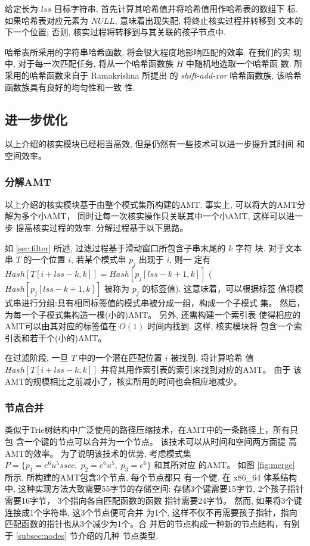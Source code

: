 给定长为 $lss$ 目标字符串, 首先计算其哈希值并将哈希值用作哈希表的数组下
标. 如果哈希表对应元素为 $NULL$, 意味着出现失配, 将终止核实过程并转移到
文本的下一个位置; 否则, 核实过程将转移到与其关联的孩子节点中.

哈希表所采用的字符串哈希函数, 将会很大程度地影响匹配的效率. 在我们的实
现中, 对于每一次匹配任务, 将从一个哈希函数族 $H$ 中随机地选取一个哈希函
数. 所采用的哈希函数来自于 Ramakrishna \cite{Ramakrishna1997} 所提出
的 \emph{shift-add-xor} 哈希函数族, 该哈希函数族具有良好的均匀性和一致
性.

\subsection{进一步优化}
\label{sec:further improments}

以上介绍的核实模块已经相当高效, 但是仍然有一些技术可以进一步提升其时间
和空间效率。

\subsubsection{分解AMT}
\label{sec:divide amt}

以上介绍的核实模块基于由整个模式集所构建的AMT. 事实上, 可以将大的AMT分
解为多个小AMT， 同时让每一次核实操作只关联其中一个小AMT, 这样可以进一步
提高核实过程的效率. 分解过程基于以下思路。

如 \ref{sec:filter} 所述, 过滤过程基于滑动窗口所包含子串末尾的 $k$ 字符
块. 对于文本串 $T$ 的一个位置 $i$, 若某个模式串 $p_j$ 出现于 $i$, 则一
定有 $Hash[T[i+lss-k,k]] = Hash[p_j[lss-k+1,k]]$
($Hash[p_j[lss-k+1,k]]$ 被称为 $p_j$ 的标签值). 这意味着，可以根据标签
值将模式串进行分组:具有相同标签值的模式串被分成一组，构成一个子模式
集。 然后，为每一个子模式集构造一棵(小的)AMT。 另外, 还需构建一个索引表
使得相应的AMT可以由其对应的标签值在 $O(1)$ 时间内找到. 这样, 核实模块将
包含一个索引表和若干个(小的)AMT。

在过滤阶段, 一旦 $T$ 中的一个潜在匹配位置 $i$ 被找到, 将计算哈希
值 $Hash[T[i+lss-k,k]]$ 并将其用作索引表的索引来找到对应的AMT。 由于
该AMT的规模相比之前减小了，核实所用的时间也会相应地减少。

\subsubsection{节点合并}
\label{sec:node merge}

类似于Trie树结构中广泛使用的路径压缩技术，在AMT中的一条路径上，所有只包
含一个键的节点可以合并为一个节点。 该技术可以从时间和空间两方面提
高AMT的效率。 为了说明该技术的优势, 考虑模式集
$P=\{p_1=e^6u^5sscc,\; p_2=e^6u^5,\; p_3=e^6\}$ 和其所对应
的AMT。 如图 \ref{fig:merge} 所示, 所构建的AMT包含3个节点, 每个节点都只
有一个键. 在 x86\_64 体系结构中, 这种实现方法大致需要55字节的存储空间:
存储3个键需要15字节, 2个孩子指针需要16字节， 3个指向各自匹配函数的函数
指针需要24字节。 然而, 如果将3个键连接成1个字符串, 这3个节点便可合并
为1个, 这样不仅不再需要孩子指针，指向匹配函数的指针也从3个减少为1个。合
并后的节点构成一种新的节点结构，有别于 \ref{subsec:nodes} 节介绍的几种
节点类型.

